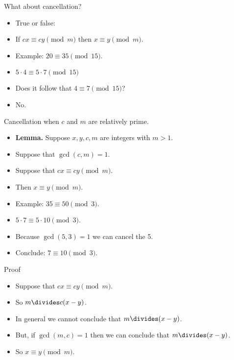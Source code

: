 \documentclass{beamer}
\begin{document}
\begin{frame}{What about cancellation?}

\begin{itemize}
  \item True or false:
  \item If $cx \equiv cy \pmod m$ then $x\equiv y \pmod m$.
  \item Example: $20 \equiv 35 \pmod {15}$.
  \item $5\cdot 4 \equiv 5 \cdot 7 \pmod {15}$
  \item Does it follow that $4 \equiv 7 \pmod {15}$?
  \item No.
\end{itemize}

\end{frame}

\begin{frame}{Cancellation when $c$ and $m$ are relatively prime.}
\begin{itemize}
  \item \textbf{Lemma.} Suppose $x,y,c,m$ are integers with $m>1$.
  \item Suppose that $\gcd(c, m) = 1$.
  \item Suppose that $cx \equiv cy \pmod m$.
  \item Then $x\equiv y \pmod m$.
  \item Example: $35 \equiv 50 \pmod 3$.
  \item $5\cdot 7 \equiv 5 \cdot 10 \pmod 3$.
  \item Because $\gcd(5,3) = 1$ we can cancel the 5.
  \item Conclude: $7\equiv 10 \pmod 3$.
\end{itemize}
\end{frame}

\begin{frame}{Proof}
\begin{itemize}
  \item Suppose that $cx \equiv cy \pmod m$.
  \item So $m \divides c(x-y)$.
  \item In general we cannot conclude that $m \divides (x-y)$.
  \item But, if $\gcd(m,c) = 1$ then we can conclude that $m\divides (x-y)$.
  \item So $x\equiv y \pmod m$.
\end{itemize}
\end{frame}
\end{document}
